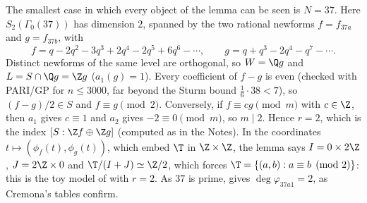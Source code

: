 The smallest case in which every object of the lemma can be seen is $N=37$. Here $S_2(\Gamma_0(37))$ has dimension $2$, spanned by the two rational newforms $f=f_{37a}$ and
$g=f_{37b}$, with
\[
f=q-2q^2-3q^3+2q^4-2q^5+6q^6-\cdots,\qquad g=q+q^3-2q^4-q^7-\cdots .
\]
Distinct newforms of the same level are orthogonal, so $W=\Q g$ and $L=S\cap\Q g=\Z g$ ($a_1(g)=1$). Every coefficient of $f-g$ is even (checked with PARI/GP for $n\le3000$, far beyond
the Sturm bound $\frac16\cdot38<7$), so $(f-g)/2\in S$ and $f\equiv g\pmod2$. Conversely, if $f\equiv cg\pmod m$ with $c\in\Z$, then $a_1$ gives $c\equiv1$ and $a_2$ gives $-2\equiv0\pmod m$, so
$m\mid2$. Hence $r=2$, which is the index
$[S:\Z f\oplus\Z g]$ (computed as in the Notes). In the coordinates $t\mapsto(\phi_f(t),\phi_g(t))$, which embed $\T$ in $\Z\times\Z$, the lemma says $I=0\times2\Z$, $J=2\Z\times0$ and
$\T/(I+J)\simeq\Z/2$, which forces $\T=\{(a,b):a\equiv b\pmod2\}$: this is the toy model of  with $r=2$. As $37$ is prime,  gives
$\deg\varphi_{37a1}=2$, as Cremona's tables confirm.

